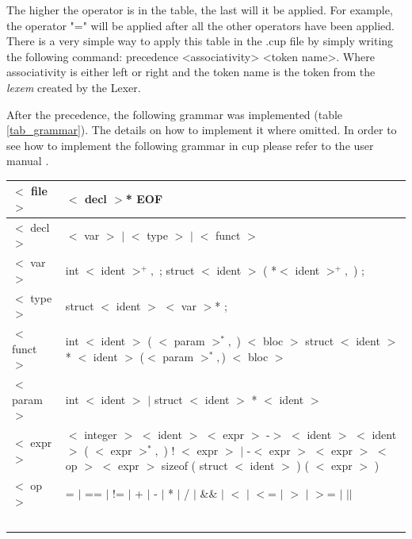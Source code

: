 \documentclass[conference]{IEEEtran}
\begin{document}
The higher the operator is in the table, the last will it be applied. For example, the operator "=" will be applied after all the other operators have been applied. There is a very simple way to apply this table in the .cup file by simply writing the following command: precedence <associativity> <token name>. Where associativity is either left or right and the token name is the token from the \textit{lexem} created by the Lexer.

After the precedence, the following grammar was implemented (table \ref{tab_grammar}). The details on how to implement it where omitted. In order to see how to implement the following grammar in cup please refer to the user manual \cite{CUP_MANUAL}.

\begin{table}[H]
	\begin{center}
		\begin{tabular}{ | m{1.5cm} | m{6.5cm}| } 
			\hline
			$<$ file $>$ & $<$ decl $>$* EOF \\ 
			\hline
			$<$ decl $>$ & $<$ var $>$ $|$ $<$ type $>$ $|$ $<$ funct $>$ \\ 
			\hline
			$<$ var $>$ & int $<$ ident $>^{+},$ ; \newline 
						struct $<$ ident $>$ ( *$<$ ident $>^{+},$ ) ; \\ 
			\hline
			$<$ type $>$ & struct $<$ ident $>$ { $<$ var $>$* } ; \\
			\hline
			$<$ funct $>$ & int $<$ ident $>$ ( $<$ param $>^{*},$ ) $<$ bloc $>$ \newline 
							struct $<$ ident $>$ * $<$ ident $>$ ($<$ param $>^{*},$) $<$ bloc $>$ \\
			\hline
			$<$ param $>$ & int $<$ ident $>$ $|$ struct $<$ ident $>$ * $<$ ident $>$ \\
			\hline
			$<$ expr $>$ & 	$<$ integer $>$ \newline 
							$<$ ident $>$ \newline
							$<$ expr $>$ -$>$ $<$ ident $>$ \newline
							$<$ ident $>$ ( $<$ expr $>^{*},$ ) \newline 
							! $<$ expr $>$ $|$ -$<$ expr $>$ \newline
							$<$ expr $>$ $<$ op $>$ $<$ expr $>$ \newline
							sizeof ( struct $<$ ident $>$ ) \newline
							( $<$ expr $>$ )	\\
			\hline
			$<$ op $>$ & = $|$ == $|$ != $|$ + $|$ - $|$ * $|$ / $|$ \&\& $|$ $<$ $|$ $<$= $|$ $>$ $|$ $>$= $|$ $|$$|$ \\ 
$$
\end{tabular}
\end{center}
\end{table}
\end{document}
